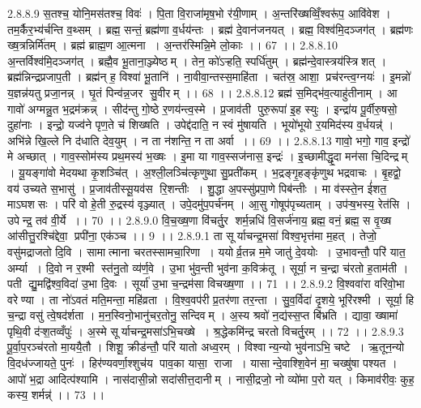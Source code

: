 2.8.8.9
स॒तश्च॒ योनि॒मस॑तश्च॒ विवः॑ । पि॒ता वि॒राजा॑मृष॒भो र॑यी॒णाम् । अ॒न्तरि॑ख्षव्विँ॒श्वरू॑प॒ आवि॑वेश । तम॒र्कैर॒भ्य॑र्चन्ति व॒थ्सम् । ब्रह्म॒ सन्तं॒ ब्रह्म॑णा व॒र्धय॑न्तः । ब्रह्म॑ दे॒वान॑जनयत् । ब्रह्म॒ विश्व॑मि॒दञ्जग॑त् । ब्रह्म॑णः ख्ष॒त्रन्निर्मि॑तम् । ब्रह्म॑ ब्राह्म॒ण आ॒त्मना । अ॒न्तर॑स्मिन्नि॒मे लो॒काः ।। 67 ।।
2.8.8.10
अ॒न्तर्विश्व॑मि॒दञ्जग॑त् । ब्रह्मै॒व भू॒ताना॒ञ्ज्येष्ठम् । तेन॒ को॑ऽऱ्हति॒ स्पर्धि॑तुम् । ब्रह्म॑न्दे॒वास्त्रय॑स्त्रिशत् । ब्रह्म॑न्निन्द्रप्रजाप॒ती । ब्रह्म॑न् ह॒ विश्वा॑ भू॒तानि॑ । ना॒वीवा॒न्तस्स॒माहि॑ता । चत॑स्र॒ आशा॒ प्रच॑रन्त्व॒ग्नयः॑ । इ॒मन्नो॑ य॒ज्ञन्न॑यतु प्रजा॒नन्न् । घृ॒तं पिन्व॑न्न॒जर॑ सु॒वीरम् ।। 68 ।।
2.8.8.12
ब्रह्म॑ स॒मिद्भ॑व॒त्याहु॑तीनाम् । आ गावो॑ अग्मन्नु॒त भ॒द्रम॑क्रन्न् । सीद॑न्तु गो॒ष्ठे र॒णय॑न्त्व॒स्मे । प्र॒जाव॑ती पुरु॒रूपा॑ इ॒ह स्युः । इन्द्रा॑य पू॒र्वीरु॒षसो॒ दुहा॑नाः । इन्द्रो॒ यज्व॑ने पृण॒ते च॑ शिख्षति । उपेद्द॑दाति॒ न स्वं मु॑षायति । भूयो॑भूयो र॒यमिद॑स्य व॒र्धयन्न्॑ । अभि॑न्ने खि॒ल्ले नि द॑धाति देव॒युम् । न ता न॑शन्ति॒ न ता अर्वा ।। 69 ।।
2.8.8.13
गावो॒ भगो॒ गाव॒ इन्द्रो॑ मे अच्छात् । गाव॒स्सोम॑स्य प्रथ॒मस्य॑ भ॒ख्षः । इ॒मा या गाव॒स्सज॑नास॒ इन्द्रः॑ । इ॒च्छामीद्धृ॒दा मन॑सा चि॒दिन्द्रम् । यू॒यङ्गा॑वो मेदयथा कृ॒शञ्चि॑त् । अ॒श्ली॒लञ्चि॑त्कृणुथा सु॒प्रती॑कम् । भ॒द्रङ्गृ॒हङ्कृ॑णुथ भद्रवाचः । बृ॒हद्वो॒ वय॑ उच्यते स॒भासु॑ । प्र॒जाव॑तीस्सू॒यव॑स रि॒शन्तीः । शु॒द्धा अ॒पस्सु॑प्रपा॒णे पिब॑न्तीः । मा व॑स्स्ते॒न ई॑शत॒ माऽघश॑सः । परि॑ वो हे॒ती रु॒द्रस्य॑ वृञ्ज्यात् । उपे॒दमु॑प॒पर्च॑नम् । आ॒सु गोषूप॑पृच्यताम् । उप॑ऱ्ष॒भस्य॒ रेत॑सि । उपेन्द्र॒ तव॑ वी॒र्ये ।। 70 ।।
2.8.9.0
वि॒च॒ख्ष॒णा वि॑चर्तु॒र शर्म॒न्नधि॑ वि॒सर्ज॑नाय॒ ब्रह्म॒ वनं॒ ब्रह्म॒ स वृ॒ख्ष आ॑सीत्तु॒रश्चि॑द्देवा॒ प्रपी॑ना॒ एक॑ञ्च ।। 9 ।।
2.8.9.1
ता सूर्याचन्द्र॒मसा॑ विश्व॒भृत्त॑मा म॒हत् । तेजो॒ वसु॑मद्राजतो दि॒वि । सामात्माना चरतस्सामचा॒रिणा । ययोर्व्र॒तन्न म॒मे जातु॑ दे॒वयोः । उ॒भावन्तौ॒ परि॑ यात॒ अर्म्या । दि॒वो न र॒श्मी स्त॑नु॒तो व्य॑र्ण॒वे । उ॒भा भु॑व॒न्ती भुव॑ना क॒विक्र॑तू । सूर्या॒ न च॒न्द्रा च॑रतो ह॒ताम॑ती । पती द्यु॒मद्वि॑श्व॒विदा॑ उ॒भा दि॒वः । सूर्या॑ उ॒भा च॒न्द्रम॑सा विचख्ष॒णा ।। 71 ।।
2.8.9.2
वि॒श्ववा॑रा वरिवो॒भा वरेण्या । ता नो॑ऽवतं मति॒मन्ता॒ महि॑व्रता । वि॒श्व॒वप॑री प्र॒तर॑णा तर॒न्ता । सु॒व॒र्विदा॑ दृ॒शये॒ भूरि॑रश्मी । सूर्या॒ हि च॒न्द्रा वसु॑ त्वे॒षद॑र्शता । म॒न॒स्विनो॒भानु॑चर॒तोनु॒ सन्दिवम् । अ॒स्य श्रवो॑ न॒द्य॑स्स॒प्त बि॑भ्रति । द्यावा॒ ख्षामा॑ पृथि॒वी द॑ऱ्श॒तव्वँपुः॑ । अ॒स्मे सूर्याचन्द्र॒मसा॑ऽभि॒चख्षे । श्र॒द्धेकमि॑न्द्र चरतो विचर्तु॒रम् ।। 72 ।।
2.8.9.3
पू॒र्वा॒प॒रञ्च॑रतो मा॒ययै॒तौ । शिशू॒ क्रीड॑न्तौ॒ परि॑ यातो अध्व॒रम् । विश्वान्य॒न्यो भुव॑नाऽभि॒ चष्टे । ऋ॒तून॒न्यो वि॒दध॑ज्जायते॒ पुनः॑ । हिर॑ण्यवर्णा॒श्शुच॑य पाव॒का यासा॒॒ राजा । यासान्दे॒वाश्शि॒वेन॑ मा॒ चख्षु॑षा पश्यत । आपो॑ भ॒द्रा आदित्प॑श्यामि । नास॑दासी॒न्नो सदा॑सीत्त॒दानीम् । नासी॒द्रजो॒ नो व्यो॑मा प॒रो यत् । किमाव॑रीवः॒ कुह॒ कस्य॒ शर्मन्न्॑ ।। 73 ।।
